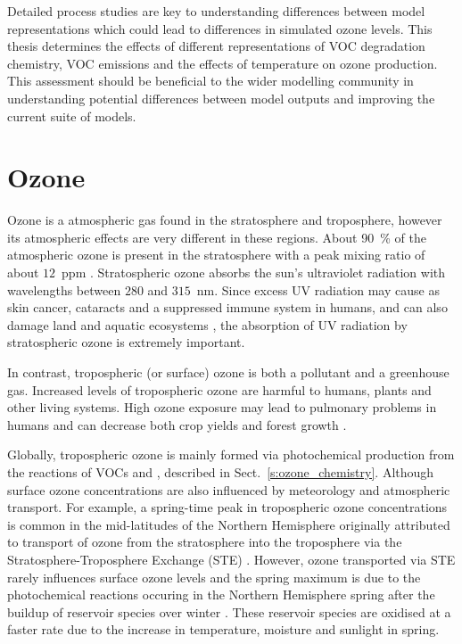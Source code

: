 Detailed process studies are key to understanding differences between model representations which could lead to differences in simulated ozone levels.
This thesis determines the effects of different representations of VOC degradation chemistry, VOC emissions and the effects of temperature on ozone production.
This assessment should be beneficial to the wider modelling community in understanding potential differences between model outputs and improving the current suite of models.

\section{Ozone} \label{s:ozone}
Ozone is a atmospheric gas found in the stratosphere and troposphere, however its atmospheric effects are very different in these regions.
About 90~\% of the atmospheric ozone is present in the stratosphere with a peak mixing ratio of about $12$~ppm \citep{Seinfeld:2006}.
Stratospheric ozone absorbs the sun's ultraviolet radiation with wavelengths between $280$ and $315$~nm.
Since excess UV radiation may cause as skin cancer, cataracts and a suppressed immune system in humans, and can also damage land and aquatic ecosystems \citep{WMO:2010}, the absorption of UV radiation by stratospheric ozone is extremely important. 

In contrast, tropospheric (or surface) ozone is both a pollutant and a greenhouse gas. 
Increased levels of tropospheric ozone are harmful to humans, plants and other living systems. 
High ozone exposure may lead to pulmonary problems in humans and can decrease both crop yields and forest growth \citep{WMO:2010}. 

Globally, tropospheric ozone is mainly formed via photochemical production from the reactions of VOCs and , described in Sect.~\ref{s:ozone_chemistry}.
Although surface ozone concentrations are also influenced by meteorology and atmospheric transport.
For example, a spring-time peak in tropospheric ozone concentrations is common in the mid-latitudes of the Northern Hemisphere originally attributed to transport of ozone from the stratosphere into the troposphere via the Stratosphere-Troposphere Exchange (STE) \citep{Monks:2000}.
However, ozone transported via STE rarely influences surface ozone levels \citep{Lelieveld:2000} and the spring maximum is due to the photochemical reactions occuring in the Northern Hemisphere spring after the buildup of reservoir species over winter \citep{Penkett:1986}.
These reservoir species are oxidised at a faster rate due to the increase in temperature, moisture and sunlight in spring.

